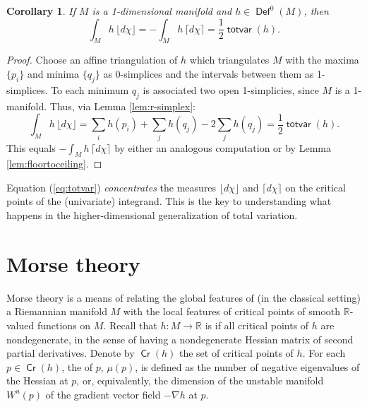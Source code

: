 \documentclass{psapm-l}
\newtheorem{corollary}[theorem]{Corollary}
\theoremstyle{definition}
\theoremstyle{remark}
\numberwithin{equation}{section}
\begin{document}
\begin{corollary}
\label{cor:totvar}
If $M$ is a 1-dimensional manifold and $h\in{{{\operatorname{\mathsf{{Def}}}}}}^0(M)$, then
\begin{equation}
\label{eq:totvar}
    \int_M h\,{{\lfloor d\chi\rfloor}}
    =
    -\int_M h\,{{\lceil d\chi\rceil}}
    =
    \frac{1}{2}{{{\operatorname{\mathsf{{totvar}}}}}}(h) .
\end{equation}
\end{corollary}
\begin{proof}
Choose an affine triangulation of $h$ which triangulates $M$ with the maxima $\{p_i\}$ and minima $\{q_j\}$ as 0-simplices and the intervals between them as 1-simplices. To each minimum $q_j$ is associated two open 1-simplicies, since $M$ is a 1-manifold. Thus, via Lemma \ref{lem:r-simplex}:
\[
    \int_M h\,{{\lfloor d\chi\rfloor}} = \sum_ih(p_i)+\sum_jh(q_j)-2\sum_jh(q_j) =\frac{1}{2}{{{\operatorname{\mathsf{{totvar}}}}}}(h) .
\]
This equals $-\int_M h\,{{\lceil d\chi\rceil}}$ by either an analogous computation or by Lemma \ref{lem:floortoceiling}.
\end{proof}

Equation (\ref{eq:totvar}) {\em concentrates} the measures ${{\lfloor d\chi\rfloor}}$ and ${{\lceil d\chi\rceil}}$ on the critical points of the (univariate) integrand. This is the key to understanding what happens in the higher-dimensional generalization of total variation.

\section{Morse theory}
\label{sec:morse}

Morse theory is a means of relating the global features of (in the classical setting) a Riemannian manifold $M$ with the local features of critical points of smooth ${{\mathbb R}}$-valued functions on $M$. Recall that $h:M\to{{\mathbb R}}$ is {{}} if all critical points of $h$ are nondegenerate, in the sense of having a nondegenerate Hessian matrix of second partial derivatives. Denote by ${{{\operatorname{\mathsf{{Cr}}}}}}(h)$ the set of critical points of $h$. For each $p\in{{{\operatorname{\mathsf{{Cr}}}}}}(h)$, the {{}} of $p$, $\mu(p)$, is defined as the number of negative eigenvalues of the Hessian at $p$, or, equivalently, the dimension of the unstable manifold $W^u(p)$ of the gradient vector field $-\nabla h$ at $p$.
\end{document}
